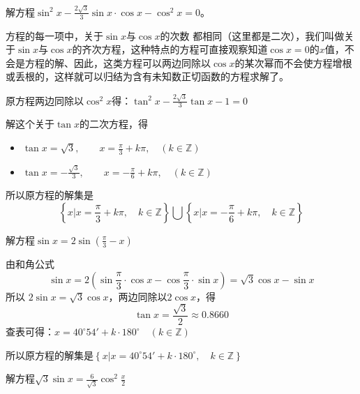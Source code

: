 \begin{example}
    解方程$\sin^2x-\frac{2\sqrt{3}}{3}\sin x\cdot \cos x-\cos^2x=0$。
\end{example}

\begin{analyze}
    方程的每一项中，关于$\sin x$与$\cos x$的次数
都相同（这里都是二次），我们叫做关于$\sin x$与$\cos x$的齐次方程，这种特点的方程可直接观察知道$\cos x=0$的$x$值，不会是方程的解、因此，这类方程可以两边同除以$\cos x$的某次幂而不会使方程增根或丢根的，这样就可以归结为含有未知数正切函数的方程求解了。
\end{analyze}

\begin{solution}
    原方程两边同除以$\cos^2x$得：$\tan^2x-\frac{2\sqrt{3}}{3}\tan x-1=0$

    解这个关于$\tan x$的二次方程，得
\begin{itemize}
    \item $\tan x=\sqrt{3},\qquad x=\frac{\pi}{3}+k\pi,\quad (k\in\mathbb{Z})$
    \item $\tan x=-\frac{\sqrt{3}}{3},\qquad x=-\frac{\pi}{6}+k\pi,\quad (k\in\mathbb{Z})$
\end{itemize}
所以原方程的解集是
\[\left\{x\Big|x=\frac{\pi}{3}+k\pi,\quad k\in\mathbb{Z} \right\}\bigcup \left\{x\Big| x=-\frac{\pi}{6}+k\pi,\quad k\in\mathbb{Z}\right\}\]

\end{solution}

\begin{example}
    解方程$\sin x=2\sin\left(\frac{\pi}{3}-x\right)$
\end{example}

\begin{solution}
    由和角公式$$\sin x=2\left(\sin\frac{\pi}{3}\cdot \cos x-\cos\frac{\pi}{3}\cdot \sin x\right)=\sqrt{3}\cos x-\sin x$$
所以 $2\sin x=\sqrt{3}\cos x$，两边同除以$2\cos x$，得
\[\tan x=\frac{\sqrt{3}}{2}\approx 0.8660\]
查表可得：$x=40^{\circ}54'+k\cdot 180^{\circ}\quad (k\in\mathbb{Z})$

所以原方程的解集是$\left\{x \Big|x=40^{\circ}54'+k\cdot 180^{\circ},\quad k\in\mathbb{Z}\right\}$
\end{solution}


\begin{example}
    解方程$\sqrt{3}\sin x=\frac{6}{\sqrt{3}}\cos^2\frac{x}{2}$
\end{example}

